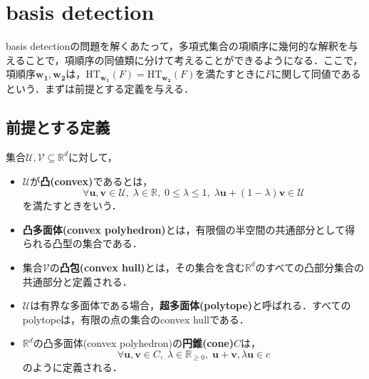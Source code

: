 \section{\groebner{} basis detection\cite{gritzmann1993minkowski}}
\groebner{} basis detectionの問題を解くあたって，多項式集合の項順序に幾何的な解釈を与えることで，項順序の同値類に分けて考えることができるようになる．ここで，項順序$\bm{w_1}, \bm{w_2}$は，$\mathrm{HT}_{\bm{w_1}}(F) = \mathrm{HT}_{\bm{w_2}}(F)$を満たすときに$F$に関して同値であるという．まずは前提とする定義を与える．
\subsection{前提とする定義}

\begin{definition}
	集合$\mathcal{U, V} \subseteq \mathbb{R}^d$に対して，
	\begin{itemize}
		\item $\mathcal{U}$が\textbf{凸(convex)}であるとは，$$\forall \bm{u, v} \in \mathcal{U}, \; \lambda \in \mathbb{R}, \; 0 \le \lambda \le 1, \; \lambda\bm{u} + (1 - \lambda) \bm{v} \in \mathcal{U}$$を満たすときをいう．
		\item \textbf{凸多面体(convex polyhedron)}とは，有限個の半空間の共通部分として得られる凸型の集合である．
		\item 集合$\mathcal{V}$の\textbf{凸包(convex hull)}とは，その集合を含む$\mathbb{R}^d$のすべての凸部分集合の共通部分と定義される．
		\item  $\mathcal{U}$は有界な多面体である場合，\textbf{超多面体(polytope)}と呼ばれる．すべてのpolytopeは，有限の点の集合のconvex hullである．
		\item $\mathbb{R}^d$の凸多面体(convex polyhedron)の\textbf{円錐(cone)}$C$は，$$\forall \bm{u, v} \in C, \; \lambda \in \mathbb{R}_{\ge 0}, \; \bm{u+v}, \lambda\bm{u} \in c$$のように定義される．
	\end{itemize}
\end{definition}
